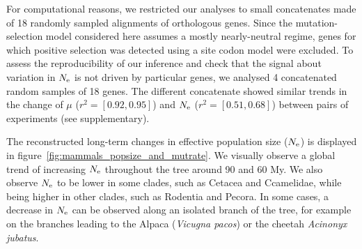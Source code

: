 \documentclass{MBE}
\begin{document}
	For computational reasons, we restricted our analyses to small concatenates made of 18 randomly sampled alignments of orthologous genes.
	Since the mutation-selection model considered here assumes a mostly nearly-neutral regime, genes for which positive selection was detected using a site codon model were excluded.
	To assess the reproducibility of our inference and check that the signal about variation in $N_{\text{e}}$ is not driven by particular genes, we analysed 4 concatenated random samples of 18 genes.
	The different concatenate showed similar trends in the change of $\mu$ ($r^2=[0.92,0.95]$) and $N_{\text{e}}$ ($r^2=[0.51,0.68]$) between pairs of experiments (see supplementary).

	The reconstructed long-term changes in {effective population size} ($N_{\text{e}}$) is displayed in figure~\ref{fig:mammals_popsize_and_mutrate}.
	We visually observe a global trend of increasing $N_{\text{e}}$ throughout the tree around 90 and 60 My.
	We also observe $N_{\text{e}}$ to be lower in some clades, such as Cetacea and Ccamelidae, while being higher in other clades, such as Rodentia and Pecora.
	In some cases, a decrease in $N_{\text{e}}$ can be observed along an isolated branch of the tree, for example on the branches leading to the Alpaca (\textit{Vicugna pacos}) or the cheetah \textit{Acinonyx jubatus}.
\end{document}
